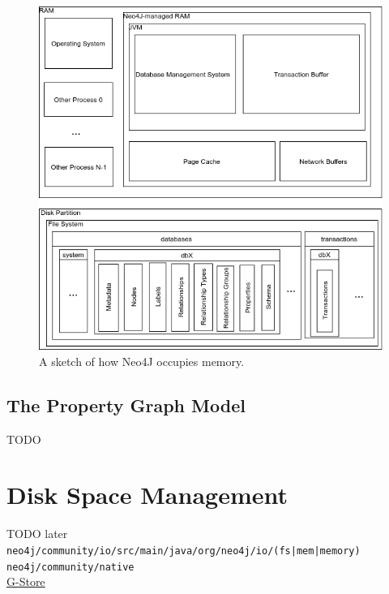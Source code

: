 \documentclass[a4paper,10pt]{article}
\begin{document}
        \begin{figure}[htp]\label{N4J_memory_view}
        \begin{center}
        \includegraphics[keepaspectratio,width=\textwidth]{img/00_intro/N4J_memory_view.png}
        \end{center}
        \caption{A sketch of how Neo4J occupies memory.} %
        \end{figure}

    \subsection{The Property Graph Model}
        TODO

\newpage


\section{Disk Space Management}
    TODO later \\
    \texttt{neo4j/community/io/src/main/java/org/neo4j/io/(fs|mem|memory)} \\
    \texttt{neo4j/community/native} \\
    \href{http://g-store.sourceforge.net/th/index.htm}{G-Store} \\
\end{document}
